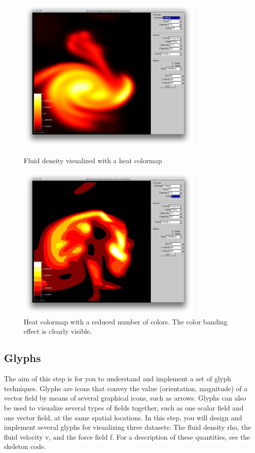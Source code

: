 \begin{figure}[htbp]
\centering
\begin{minipage}[t]{0.48\textwidth}
        \includegraphics[height=3in]{figures/colormaps/heatmapSmoke.png}
\caption{Fluid density visualized with a heat colormap}
\label{fig:heatmap}
\end{minipage}\hspace{.04\textwidth}%
\begin{minipage}[t]{0.48\textwidth}
        \includegraphics[height=3in]{figures/colormaps/heatmapSmokeBanded.png}
    \caption{Heat colormap with a reduced number of colors. The color banding effect is clearly visible.}
    \label{fig:banding}
\end{minipage}
\end{figure}

\clearpage

\subsection{Glyphs}


The aim of this step is for you to understand and implement a set of glyph techniques. Glyphs are icons that convey the value (orientation, magnitude) of a vector field by means of several graphical icons, such as arrows. Glyphs can also be used to visualize several types of fields together, such as one scalar field and one vector field, at the same spatial locations. In this step, you will design and implement several glyphs for visualizing three datasets: The fluid density rho, the fluid velocity v, and the force field f. For a description of these quantities, see the skeleton code.
 
